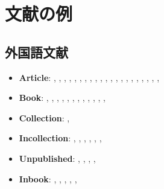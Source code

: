
\section{文献の例}

\subsection{外国語文献}

\begin{itemize}
 \item \textbf{Article}: 
       \textcite{brezis93:_leap},
       \textcite{ishikawa94:cje},
       \textcite{Biker-2007-unemployment},
       \textcite{takeda12:cce},
       \textcite{takeda07:jjie},
       \textcite{yamazaki13:_japan},
       \textcite{takeda10:irae},
       \textcite{babiker05:ej},
       \textcite{yamasue09:mt},
       \textcite{yamasue07:mt},
       \textcite{babiker00:ep},
       \textcite{parry97:ree},
       \textcite{takeda19:ere},
       \textcite{takeda14:eeps},
       \textcite{imbens19:reas},
       \textcite{attwood06:_sexed_up},
       \textcite{aksin20063027},
       \textcite{baez/article},
       \textcite{bohringer07:ecoe},
       \textcite{bohringer06:ecoe},
       \textcite{krugman79:jie},
 \item \textbf{Book}:
       \textcite{krugman91:_geog},
       \textcite{helpman91:_int},
       \textcite{fujita99:_spatial},
       \textcite{ryza15:_advan},
       \textcite{pearl2009Causality},
       \textcite{attwood09:_mains_sex},
       \textcite{attwood10:_porn},
       \textcite{jones84:_hb_int},
       \textcite{jones85:_hb_int},
       \textcite{jones97:_hb_int},
       \textcite{aristotle:poetics},
       \textcite{aristotle:physics},
       \textcite{aristotle:anima}
 \item \textbf{Collection}:
       \textcite{westfahl:frontier},
 \item \textbf{Incollection}:
       \textcite{krugman91:_bila},
       \textcite{lucas76:_critique},
       \textcite{DeGorter2002},
       \textcite{balistreri20131513},
       \textcite{westfahl:space},
       \textcite{Mcconnell2005},
 \item \textbf{Unpublished}:
       \textcite{ishikawa03:_ghg},
       \textcite{rutherford00:_gtap},
       \textcite{takeda15:_lab},
       \textcite{babiker99:_kyoto},
 \item \textbf{Inbook}:
       \textcite{wong95:_int},
       \textcite{milne-thomson68:_theor},
       \textcite{kant:kpv},
       \textcite{kant:ku},
       \textcite{nietzsche:historie},

\end{itemize}
